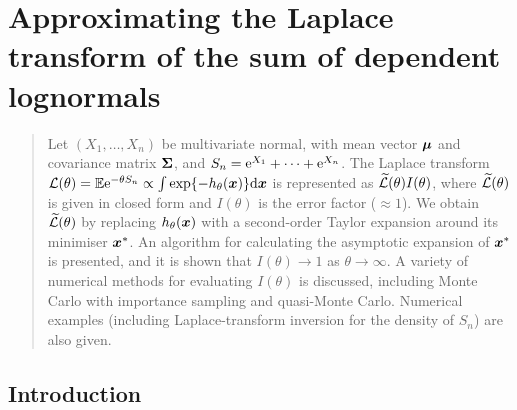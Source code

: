 \chapter{Approximating the Laplace transform of the sum of dependent lognormals}

% 

\begin{abstract}
Let $(X_1, \dots, X_n)$ be multivariate normal, with mean vector $\bm{\mu}$ and
covariance matrix $\bm{\Sigma}$, and $S_n=\mathrm{e}^{X_1}+\cdots+\mathrm{e}^{X_n}$. The
Laplace transform ${\cal L}(\theta)=\mathbb{E}\mathrm{e}^{-\theta S_n}\propto \int
\exp\{-h_\theta(\bm{x})\} \mathrm{d} \bm{x}$ is represented as $\widetilde {\cal
  L}(\theta)I(\theta)$, where $\widetilde {\cal L}(\theta)$ is given in closed
form and $I(\theta)$ is the error factor ($\approx 1$). We obtain $\widetilde
{\cal L}(\theta)$ by replacing $h_\theta(\bm{x})$ with a second-order Taylor
expansion around its minimiser $\bm{x}^*$. An algorithm for calculating the
asymptotic expansion of $\bm{x}^*$ is presented, and it is shown that
$I(\theta)\to 1$ as $\theta\to\infty$.  A variety of numerical methods for
evaluating $I(\theta)$ is discussed, including Monte Carlo with importance
sampling and quasi-Monte Carlo. Numerical examples (including
Laplace-transform inversion for the density of $S_n$) are also given.
\end{abstract}


\section{Introduction}\label{S:Intro}

